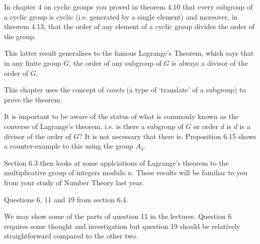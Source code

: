 \documentclass[oneside,10pt]{amsart}
\begin{document}


In chapter 4 on cyclic groups you proved in theorem 4.10 that every subgroup of a cyclic group is cyclic (i.e. generated by a single element) and moreover, in theorem 4.13, that the order of any element of a cyclic group divides the order of the group.

This latter result generalises to the famous Lagrange's Theorem, which says that in any finite group $G$, the order of any subgroup of $G$ is always a divisor of the order of $G$.

This chapter uses the concept of \emph{cosets} (a type of `translate' of a subgroup) to prove the theorem.

It is important to be aware of the status of what is commonly known as the converse of Lagrange's theorem, i.e. is there a subgroup of $G$ or order $d$ is $d$ is a divisor of the order of $G$? It is not necessary that there is. Proposition 6.15 shows a counter-example to this using the group $A_4$.

Section 6.3 then looks at some applciations of Lagrange's theorem to the multiplicative group of integers modulo $n$. These results will be familiar to you from your study of Number Theory last year.

Questions 6, 11 and 19 from section 6.4.

We may show some of the parts of question 11 in the lectures. Question 6 requires some thought and investigation but question 19 should be relatively straightforward compared to the other two.
\end{document}
